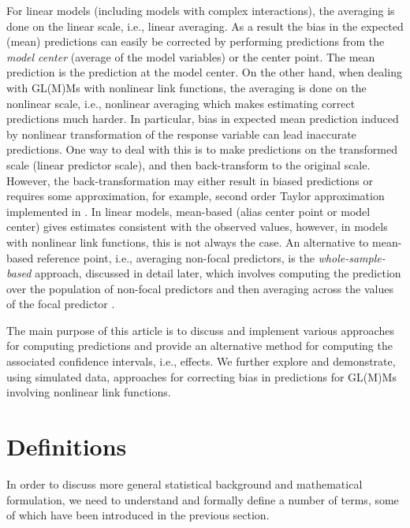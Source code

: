 For linear models (including models with complex interactions), the averaging is done on the linear scale, i.e., linear averaging. As a result the bias in the expected (mean) predictions can easily be corrected by performing predictions from the \emph{model center} (average of the model variables) or the center point. The mean prediction is the prediction at the model center. On the other hand, when dealing with GL(M)Ms with nonlinear link functions, the averaging is done on the nonlinear scale, i.e., nonlinear averaging which makes estimating correct predictions much harder. In particular, bias in expected mean prediction induced by nonlinear transformation of the response variable can lead inaccurate predictions. One way to deal with this is to make predictions on the transformed scale (linear predictor scale), and then back-transform to the original scale. However, the back-transformation may either result in biased predictions or requires some approximation, for example, second order Taylor approximation implemented in  \citep{lenth2018package}. In linear models, mean-based (alias center point or model center) gives estimates consistent with the observed values, however, in models with nonlinear link functions, this is not always the case. An alternative to mean-based reference point, i.e., averaging non-focal predictors, is the \emph{whole-sample-based} approach, discussed in detail later, which involves computing the prediction over the population of non-focal predictors and then averaging across the values of the focal predictor \citep{hanmer2013behind}. 

The main purpose of this article is to discuss and implement various approaches for computing predictions and provide an alternative method for computing the associated confidence intervals, i.e., effects. We further explore and demonstrate, using simulated data, approaches for correcting bias in predictions for GL(M)Ms involving nonlinear link functions.

\section{Definitions}

In order to discuss more general statistical background and mathematical formulation, we need to understand and formally define a number of terms, some of which have been introduced in the previous section.

